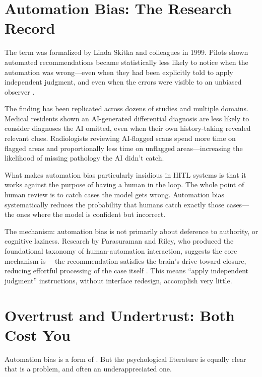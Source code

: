 \section{Automation Bias: The Research Record}

The term was formalized by Linda Skitka and colleagues in 1999. Pilots shown automated recommendations became statistically less likely to notice when the automation was wrong---even when they had been explicitly told to apply independent judgment, and even when the errors were visible to an unbiased observer \autocite{skitka1999automation}.

The finding has been replicated across dozens of studies and multiple domains. Medical residents shown an AI-generated differential diagnosis are less likely to consider diagnoses the AI omitted, even when their own history-taking revealed relevant clues. Radiologists reviewing AI-flagged scans spend more time on flagged areas and proportionally less time on unflagged areas---increasing the likelihood of missing pathology the AI didn't catch.

What makes automation bias particularly insidious in HITL systems is that it works against the purpose of having a human in the loop. The whole point of human review is to catch cases the model gets wrong. Automation bias systematically reduces the probability that humans catch exactly those cases---the ones where the model is confident but incorrect.

The mechanism: automation bias is not primarily about deference to authority, or cognitive laziness. Research by Parasuraman and Riley, who produced the foundational taxonomy of human-automation interaction, suggests the core mechanism is ---the recommendation satisfies the brain's drive toward closure, reducing effortful processing of the case itself \autocite{parasuraman1997humans,parasuraman2010complacency}. This means ``apply independent judgment'' instructions, without interface redesign, accomplish very little.

\section{Overtrust and Undertrust: Both Cost You}

Automation bias is a form of . But the psychological literature is equally clear that  is a problem, and often an underappreciated one.

